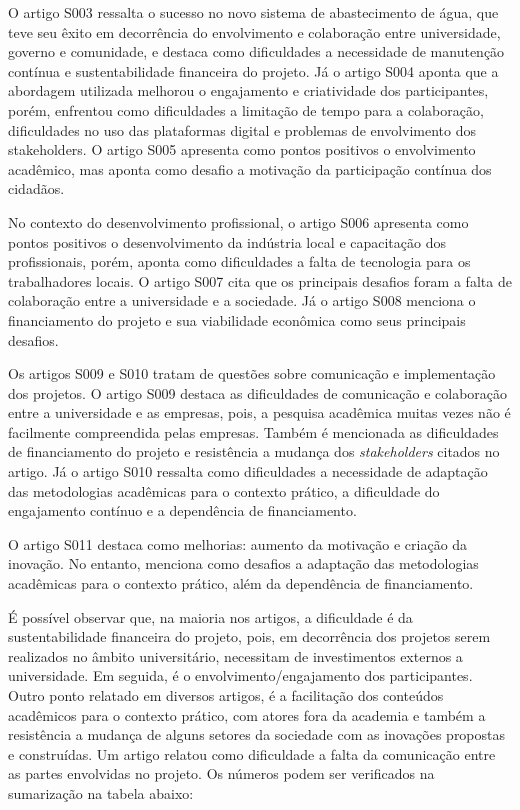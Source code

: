 O artigo S003 ressalta o sucesso no novo sistema de abastecimento de água, que teve seu êxito em decorrência do envolvimento e colaboração entre universidade, governo e comunidade, e destaca como dificuldades a necessidade de manutenção contínua e sustentabilidade financeira do projeto. Já o artigo S004 aponta que a abordagem utilizada melhorou o engajamento e criatividade dos participantes, porém, enfrentou como dificuldades a limitação de tempo para a colaboração, dificuldades no uso das plataformas digital e problemas de envolvimento dos stakeholders. O artigo S005 apresenta como pontos positivos o envolvimento acadêmico, mas aponta como desafio a motivação da participação contínua dos cidadãos. 

No contexto do desenvolvimento profissional, o artigo S006 apresenta como pontos positivos o desenvolvimento da indústria local e capacitação dos profissionais, porém, aponta como dificuldades a falta de tecnologia para os trabalhadores locais. O artigo S007 cita que os principais desafios foram a falta de colaboração entre a universidade e a sociedade. Já o artigo S008 menciona o financiamento do projeto e sua viabilidade econômica como seus principais desafios.

Os artigos S009 e S010 tratam de questões sobre comunicação e implementação dos projetos. O artigo S009 destaca as dificuldades de comunicação e colaboração entre a universidade e as empresas, pois, a pesquisa acadêmica muitas vezes não é facilmente compreendida pelas empresas. Também é mencionada as dificuldades de financiamento do projeto e resistência a mudança dos \textit{stakeholders} citados no artigo. Já o artigo S010 ressalta como dificuldades a necessidade de adaptação das metodologias acadêmicas para o contexto prático, a dificuldade do engajamento contínuo e a dependência de financiamento.

O artigo S011 destaca como melhorias: aumento da motivação e criação da inovação. No entanto, menciona como desafios a adaptação das metodologias acadêmicas para o contexto prático, além da dependência de financiamento. 

É possível observar que, na maioria nos artigos, a dificuldade é da sustentabilidade financeira do projeto, pois, em decorrência dos projetos serem realizados no âmbito universitário, necessitam de investimentos externos a universidade. Em seguida, é o envolvimento/engajamento dos participantes. Outro ponto relatado em diversos artigos, é a facilitação dos conteúdos acadêmicos para o contexto prático, com atores fora da academia e também a resistência a mudança de alguns setores da sociedade com as inovações propostas e construídas. Um artigo relatou como dificuldade a falta da comunicação entre as partes envolvidas no projeto. Os números podem ser verificados na sumarização na tabela abaixo:


